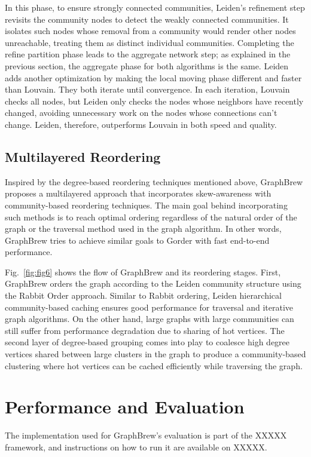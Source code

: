 \documentclass[sigconf, nonacm]{acmart}
\begin{document}
In this phase, to ensure strongly connected communities, Leiden’s refinement step revisits the community nodes to detect the weakly connected communities. It isolates such nodes whose removal from a community would render other nodes unreachable, treating them as distinct individual communities. Completing the refine partition phase leads to the aggregate network step; as explained in the previous section, the aggregate phase for both algorithms is the same. Leiden adds another optimization by making the local moving phase different and faster than Louvain. They both iterate until convergence. In each iteration, Louvain checks all nodes, but Leiden only checks the nodes whose neighbors have recently changed, avoiding unnecessary work on the nodes whose connections can’t change. Leiden, therefore, outperforms Louvain in both speed and quality.

\subsection{Multilayered Reordering}
Inspired by the degree-based reordering techniques mentioned above, GraphBrew proposes a multilayered approach that incorporates skew-awareness with community-based reordering techniques. The main goal behind incorporating such methods is to reach optimal ordering regardless of the natural order of the graph or the traversal method used in the graph algorithm. In other words, GraphBrew tries to achieve similar goals to Gorder with fast end-to-end performance.

Fig.~\ref{fig:fig6} shows the flow of GraphBrew and its reordering stages. First, GraphBrew orders the graph according to the Leiden community structure using the Rabbit Order approach. Similar to Rabbit ordering, Leiden hierarchical community-based caching ensures good performance for traversal and iterative graph algorithms. On the other hand, large graphs with large communities can still suffer from performance degradation due to sharing of hot vertices. 
The second layer of degree-based grouping comes into play to coalesce high degree vertices shared between large clusters in the graph to produce a community-based clustering where hot vertices can be cached efficiently while traversing the graph.

\section{Performance and Evaluation}

The implementation used for GraphBrew's evaluation is part of the XXXXX framework, and instructions on how to run it are available on XXXXX.
\end{document}
